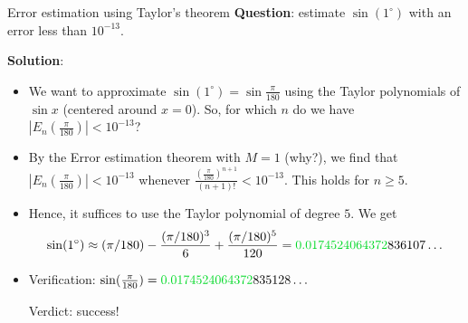 \begin{frame}{Error estimation using Taylor's theorem}
    \textbf{Question}: estimate $\sin(1^\circ)$ with an error less than $10^{-13}$.

    \vspace{2mm}
    \pause
    \textbf{Solution}: 
    \begin{itemize}
        \pause\item We want to approximate $\sin(1^\circ)=\sin\frac\pi{180}$ using the Taylor polynomials of $\sin x$ (centered around $x=0$). So, for which $n$ do we have $|E_n(\frac\pi{180})|<10^{-13}$?

        \pause\item By the Error estimation theorem with $M=1$ (why?), we find that $|E_n(\frac\pi{180})|<10^{-13}$ whenever $\frac{(\frac\pi{180})^{n+1}}{(n+1)!}<10^{-13}$. This holds for $n\geq5$.

        \pause\item Hence, it suffices to use the Taylor polynomial of degree $5$. We get
        {\footnotesize\[\sin(1^\circ)\approx (\pi/180)-\frac{(\pi/180)^3}6+\frac{(\pi/180)^5}{120}={\color{green!70!teal}0.0174524064372}836107\dots\]}

            \pause\item Verification: {\footnotesize$\sin(\frac\pi{180})={\color{green!70!teal}0.0174524064372}835128\dots$}
        
            \pause
            Verdict: success!
        \end{itemize}
    
\end{frame}





